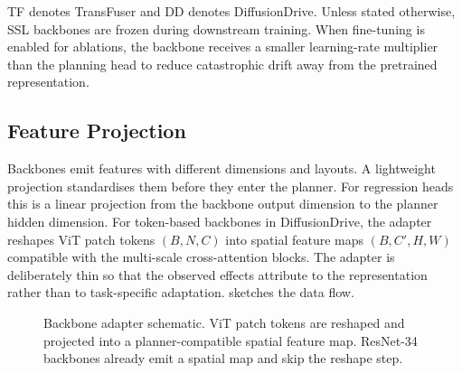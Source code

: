 TF denotes TransFuser and DD denotes DiffusionDrive. Unless stated otherwise, SSL backbones are frozen during downstream training. When fine-tuning is enabled for ablations, the backbone receives a smaller learning-rate multiplier than the planning head to reduce catastrophic drift away from the pretrained representation.

\subsection{Feature Projection}
\label{sec:meth-feature-proj}

Backbones emit features with different dimensions and layouts. A lightweight projection standardises them before they enter the planner. For regression heads this is a linear projection from the backbone output dimension to the planner hidden dimension. For token-based backbones in DiffusionDrive, the adapter reshapes ViT patch tokens $(B, N, C)$ into spatial feature maps $(B, C', H, W)$ compatible with the multi-scale cross-attention blocks. The adapter is deliberately thin so that the observed effects attribute to the representation rather than to task-specific adaptation.  sketches the data flow.

\begin{figure}[ht]
    \centering
    \caption[Backbone adapter schematic.]{Backbone adapter schematic. ViT patch tokens are reshaped and projected into a planner-compatible spatial feature map. ResNet-34 backbones already emit a spatial map and skip the reshape step.}
    \label{fig:method-adapter}
\end{figure}

